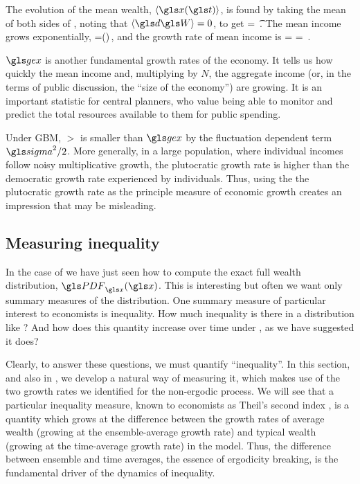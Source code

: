 The evolution of the mean wealth, $\ave{\x(\t)}$, is found by taking the mean of both sides of , noting that $\ave{\gd\gW}=0$, to get
\be
\gd\ave{\x} = \gmu \gd\t\,.
\ee
The mean income grows exponentially,
%
\be
\ave{\x(\t+\Dt)}=\ave{\x(\t)}\exp(\gmu\Dt)\,,
\ee
%
and the growth rate of mean income is
%
\be
\gex = \frac{\D\ln\ave{\x}}{\Dt} = \gmu\,.
\ee
%

$\gex$ is another fundamental growth rates of the economy. It tells us how quickly the mean income and, multiplying by $N$, the aggregate income (or, in the terms of public discussion, the ``size of the economy'') are growing. It is an important statistic for central planners, who value being able to monitor and predict the total resources available to them for public spending.

Under GBM, $\gt$ is smaller than $\gex$ by the fluctuation dependent term $\gsigma^2/2$. More generally, in a large population, where individual incomes follow noisy multiplicative growth, the plutocratic growth rate is higher than the democratic growth rate experienced by individuals. Thus, using the the plutocratic growth rate as the principle measure of economic growth creates an impression that may be misleading.


\subsection{Measuring inequality}
In the case of \GBM we have just seen how to 
compute the exact full wealth distribution, $\PDF_\x(\x)$. This is interesting but often we want only summary measures of the distribution. One summary measure of particular interest to economists is inequality. How much inequality is there in a distribution like ? And how does this quantity increase over time under \GBM, as we have suggested it does?

Clearly, to answer these questions, we must quantify ``inequality''. In this section, and also in \cite{AdamouPeters2016}, we develop a natural way of measuring it, which makes use of the two growth rates we identified for the non-ergodic process. We will see that a particular inequality measure, known to economists as Theil's second index \cite{Theil1967}, is a quantity which grows at the difference between the growth rates of average wealth (growing at the ensemble-average growth rate) and typical wealth (growing at the time-average growth rate) in the \GBM model. Thus, the difference between ensemble and time averages, the essence of ergodicity breaking, is the fundamental driver of the dynamics of inequality.

